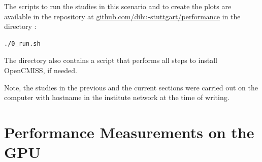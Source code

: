 % 
% 



\begin{reproduce_no_break}
  The scripts to run the studies in this scenario and to create the plots are available in the repository at \href{https://github.com/dihu-stuttgart/performance}{github.com/dihu-stuttgart/performance}
  in the directory :
  \begin{lstlisting}[columns=fullflexible,breaklines=true,postbreak=\mbox{\textcolor{gray}{$\hookrightarrow$}\space}]
    ./0_run.sh
  \end{lstlisting}
  The directory also contains a script that performs all steps to install OpenCMISS, if needed. 
  
  Note, the studies in the previous and the current sections were carried out on the computer with hostname  in the institute network at the time of writing.
\end{reproduce_no_break}



\section{Performance Measurements on the GPU}

